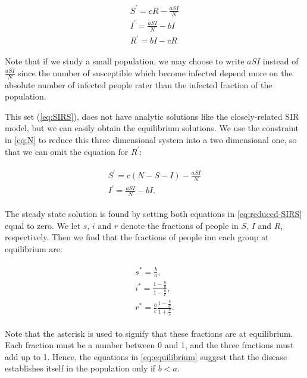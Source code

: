 \documentclass[../main.tex]{subfiles}
\begin{document}
\begin{align}
\begin{split}
    S^{'}=cR-\frac{aSI}{N} \\
    I^{'}=\frac{aSI}{N}-bI \\
    R^{'}=bI-cR
\end{split}
\label{eq:SIRS}
\end{align}

Note that if we study a small population, we may choose to write \ensuremath{aSI} instead of \ensuremath{\frac{aSI}{N}} since the number of susceptible which become infected depend more on the absolute number of infected people rater than the infected fraction of the population. 

This set (\cref{eq:SIRS}), does not have analytic solutions like the closely-related SIR model, but we can easily obtain the equilibrium solutions. We use the constraint in \cref{eq:N} to reduce this three dimensional system into a two dimensional one, so that we can omit the equation for \ensuremath{R^{'}}:

\begin{align}
    \begin{split}
        S^{'}=c(N-S-I)-\frac{aSI}{N} \\
        I^{'}=\frac{aSI}{N}-bI.
    \end{split}
    \label{eq:reduced-SIRS}
\end{align}

The steady state solution is found by setting both equations in \cref{eq:reduced-SIRS} equal to zero. We let $s$, $i$ and $r$ denote the fractions of people in $S$, $I$ and $R$, respectively. Then we find that the fractions of people inn each group at equilibrium are:

\begin{align}
    \begin{split}
        s^*=\frac{b}{a}, \\
        i^*=\frac{1-\frac{b}{a}}{1-\frac{b}{c}}, \\
        r^*=\frac{b}{c}\frac{1-\frac{b}{a}}{1+\frac{b}{c}}.
    \end{split}
    \label{eq:equilibrium}
\end{align}

Note that the asterisk is used to signify that these fractions are at equilibrium. Each fraction must be a number between 0 and 1, and the three fractions must add up to 1. Hence, the equations in \cref{eq:equilibrium} suggest that the disease establishes itself in the population only if \ensuremath{b<a}.
\end{document}
